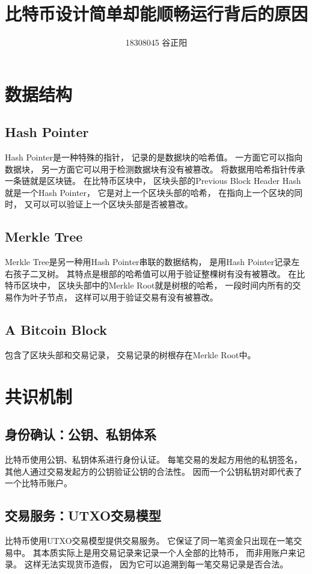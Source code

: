 \documentclass[UTF8,12pt]{article}
\title{比特币设计简单却能顺畅运行背后的原因}
\date{}
\author{18308045 谷正阳}
\begin{document}
    \maketitle
    \section{数据结构}
    \subsection{Hash Pointer}
    Hash Pointer是一种特殊的指针，
    记录的是数据块的哈希值。
    一方面它可以指向数据块，
    另一方面它可以用于检测数据块有没有被篡改。
    将数据用哈希指针传承一条链就是区块链。
    在比特币区块中，
    区块头部的Previous Block Header Hash就是一个Hash Pointer，
    它是对上一个区块头部的哈希，
    在指向上一个区块的同时，
    又可以可以验证上一个区块头部是否被篡改。
    \subsection{Merkle Tree}
    Merkle Tree是另一种用Hash Pointer串联的数据结构，
    是用Hash Pointer记录左右孩子二叉树。
    其特点是根部的哈希值可以用于验证整棵树有没有被篡改。
    在比特币区块中，
    区块头部中的Merkle Root就是树根的哈希，
    一段时间内所有的交易作为叶子节点，
    这样可以用于验证交易有没有被篡改。
    \subsection{A Bitcoin Block}
    包含了区块头部和交易记录，
    交易记录的树根存在Merkle Root中。
    \section{共识机制}
    \subsection{身份确认：公钥、私钥体系}
    比特币使用公钥、私钥体系进行身份认证。
    每笔交易的发起方用他的私钥签名，
    其他人通过交易发起方的公钥验证公钥的合法性。
    因而一个公钥私钥对即代表了一个比特币账户。
    \subsection{交易服务：UTXO交易模型}
    比特币使用UTXO交易模型提供交易服务。
    它保证了同一笔资金只出现在一笔交易中。
    其本质实际上是用交易记录来记录一个人全部的比特币，
    而非用账户来记录。
    这样无法实现货币造假，
    因为它可以追溯到每一笔交易记录是否合法。
\end{document}
